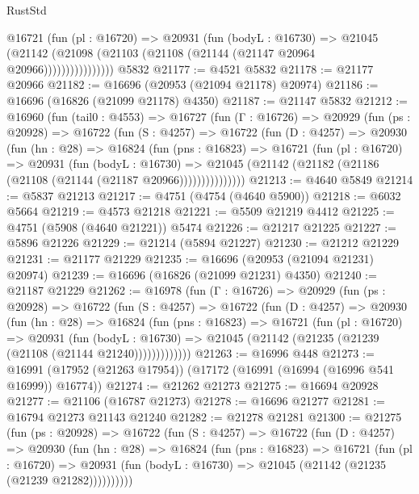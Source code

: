 \begin{lexlean}{RustStd}
\begin{coremodule}
                  @16721
                    (fun (pl : @16720) =>
                    @20931
                      (fun (bodyL : @16730) =>
                      @21045
                        (@21142
                          (@21098 (@21103 (@21108 (@21144 (@21147 @20964 @20966))))))))))))))))
    @5832
@21177 := @4521 @5832
@21178 := @21177 @20966
@21182 := @16696 (@20953 (@21094 @21178) @20974)
@21186 := @16696 (@16826 (@21099 @21178) @4350)
@21187 := @21147 @5832
@21212 := @16960
    (fun (tail0 : @4553) =>
    @16727
      (fun (Γ : @16726) =>
      @20929
        (fun (ps : @20928) =>
        @16722
          (fun (S : @4257) =>
          @16722
            (fun (D : @4257) =>
            @20930
              (fun (hn : @28) =>
              @16824
                (fun (pns : @16823) =>
                @16721
                  (fun (pl : @16720) =>
                  @20931
                    (fun (bodyL : @16730) =>
                    @21045 (@21142 (@21182 (@21186 (@21108 (@21144 (@21187 @20966)))))))))))))))
@21213 := @4640 @5849
@21214 := @5837 @21213
@21217 := @4751 (@4754 (@4640 @5900))
@21218 := @6032 @5664
@21219 := @4573 @21218
@21221 := @5509 @21219 @4412
@21225 := @4751 (@5908 (@4640 @21221)) @5474
@21226 := @21217 @21225
@21227 := @5896 @21226
@21229 := @21214 (@5894 @21227)
@21230 := @21212 @21229
@21231 := @21177 @21229
@21235 := @16696 (@20953 (@21094 @21231) @20974)
@21239 := @16696 (@16826 (@21099 @21231) @4350)
@21240 := @21187 @21229
@21262 := @16978
    (fun (Γ : @16726) =>
    @20929
      (fun (ps : @20928) =>
      @16722
        (fun (S : @4257) =>
        @16722
          (fun (D : @4257) =>
          @20930
            (fun (hn : @28) =>
            @16824
              (fun (pns : @16823) =>
              @16721
                (fun (pl : @16720) =>
                @20931
                  (fun (bodyL : @16730) =>
                  @21045 (@21142 (@21235 (@21239 (@21108 (@21144 @21240)))))))))))))
@21263 := @16996 @448
@21273 := @16991 (@17952 (@21263 @17954)) (@17172 (@16991 (@16994 (@16996 @541 @16999)) @16774))
@21274 := @21262 @21273
@21275 := @16694 @20928
@21277 := @21106 (@16787 @21273)
@21278 := @16696 @21277
@21281 := @16794 @21273 @21143 @21240
@21282 := @21278 @21281
@21300 := @21275
    (fun (ps : @20928) =>
    @16722
      (fun (S : @4257) =>
      @16722
        (fun (D : @4257) =>
        @20930
          (fun (hn : @28) =>
          @16824
            (fun (pns : @16823) =>
            @16721
              (fun (pl : @16720) =>
              @20931 (fun (bodyL : @16730) => @21045 (@21142 (@21235 (@21239 @21282))))))))))

\end{coremodule}
\end{lexlean}
